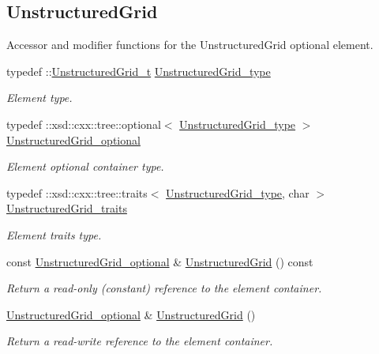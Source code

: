 \subsection*{Unstructured\+Grid}
\label{_amgrp51267337395fceec37fec7e87b9a53e5}%
Accessor and modifier functions for the Unstructured\+Grid optional element. \begin{DoxyCompactItemize}
\item 
typedef \+::\hyperlink{classUnstructuredGrid__t}{Unstructured\+Grid\+\_\+t} \hyperlink{classVTKFile__t_a34ea02f6804e701657f11a8dc3851951}{Unstructured\+Grid\+\_\+type}
\begin{DoxyCompactList}\small\item\em Element type. \end{DoxyCompactList}\item 
typedef \+::xsd\+::cxx\+::tree\+::optional$<$ \hyperlink{classVTKFile__t_a34ea02f6804e701657f11a8dc3851951}{Unstructured\+Grid\+\_\+type} $>$ \hyperlink{classVTKFile__t_ada5bb5a706e03ef1ab2ed1513ea83833}{Unstructured\+Grid\+\_\+optional}
\begin{DoxyCompactList}\small\item\em Element optional container type. \end{DoxyCompactList}\item 
typedef \+::xsd\+::cxx\+::tree\+::traits$<$ \hyperlink{classVTKFile__t_a34ea02f6804e701657f11a8dc3851951}{Unstructured\+Grid\+\_\+type}, char $>$ \hyperlink{classVTKFile__t_a02772a5f713678f02e94188d6a552528}{Unstructured\+Grid\+\_\+traits}
\begin{DoxyCompactList}\small\item\em Element traits type. \end{DoxyCompactList}\item 
const \hyperlink{classVTKFile__t_ada5bb5a706e03ef1ab2ed1513ea83833}{Unstructured\+Grid\+\_\+optional} \& \hyperlink{classVTKFile__t_a118852d8ec1f8039d1fd5c914282351a}{Unstructured\+Grid} () const 
\begin{DoxyCompactList}\small\item\em Return a read-\/only (constant) reference to the element container. \end{DoxyCompactList}\item 
\hyperlink{classVTKFile__t_ada5bb5a706e03ef1ab2ed1513ea83833}{Unstructured\+Grid\+\_\+optional} \& \hyperlink{classVTKFile__t_aa4746d4a723076d4643b8ef16a9c3890}{Unstructured\+Grid} ()
\begin{DoxyCompactList}\small\item\em Return a read-\/write reference to the element container. \end{DoxyCompactList}\item 

\end{DoxyCompactItemize}
